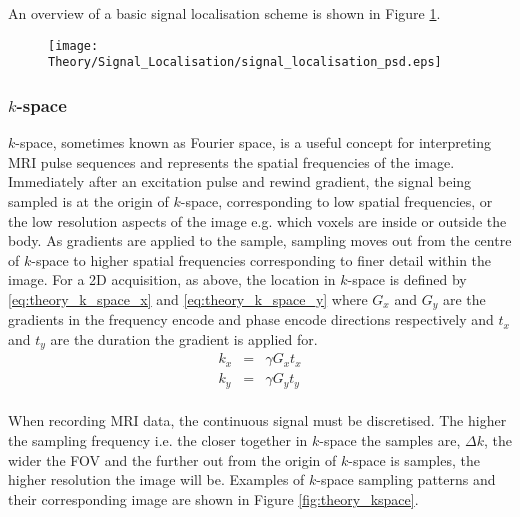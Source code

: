 An overview of a basic signal localisation scheme is shown in Figure \ref{fig:theory_signal_loc}.
\begin{figure}[H]
	\centering
	\texttt{[image: Theory/Signal\_Localisation/signal\_localisation\_psd.eps]}
	\caption{}
	\label{fig:theory_signal_loc}	
\end{figure}

\subsubsection{$k$-space}
$k$-space, sometimes known as Fourier space, is a useful concept for interpreting \ac{MRI} pulse sequences and represents the spatial frequencies of the image. Immediately after an excitation pulse and rewind gradient, the signal being sampled is at the origin of $k$-space, corresponding to low spatial frequencies, or the low resolution aspects of the image e.g. which voxels are inside or outside the body. As gradients are applied to the sample, sampling moves out from the centre of $k$-space to higher spatial frequencies corresponding to finer detail within the image. For a 2D acquisition, as above, the location in $k$-space is defined by \eqref{eq:theory_k_space_x} and \eqref{eq:theory_k_space_y} where $G_x$ and $G_y$ are the gradients in the frequency encode and phase encode directions respectively and $t_x$ and $t_y$ are the duration the gradient is applied for.
\begin{eqnarray}
k_x &=& \gamma G_x t_x
\label{eq:theory_k_space_x} \\
k_y &=& \gamma G_y t_y
\label{eq:theory_k_space_y}
\end{eqnarray}\\

When recording \ac{MRI} data, the continuous signal must be discretised. The higher the sampling frequency i.e. the closer together in $k$-space the samples are, $\Delta k$, the wider the \ac{FOV} and the further out from the origin of $k$-space is samples, the higher resolution the image will be. Examples of $k$-space sampling patterns and their corresponding image are shown in Figure \ref{fig:theory_kspace}.

